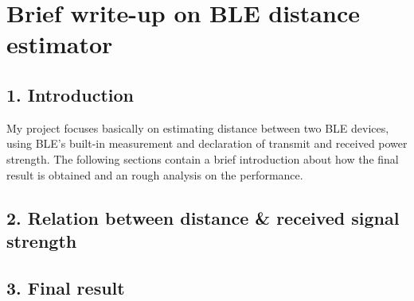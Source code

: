 \documentclass{article}
\begin{document}
    \section*{Brief write-up on BLE distance estimator}
    
    \subsection*{1. Introduction}
    My project focuses basically on estimating distance between two BLE devices, using BLE's built-in measurement and declaration of transmit and received power strength. The following sections contain a brief introduction about how the final result is obtained and an rough analysis on the performance.
    
    \subsection*{2. Relation between distance \& received signal strength}
    \subsection*{3. Final result}
\end{document}
